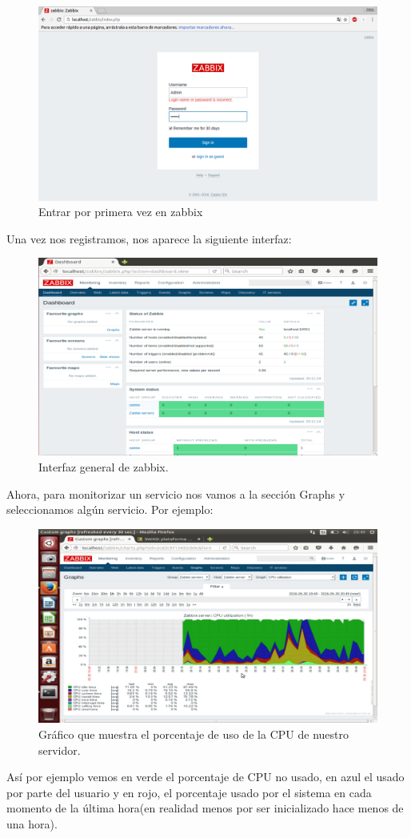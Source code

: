 \begin{itemize}
	\begin{figure}[H]
	\centering
	\includegraphics[width=0.7\linewidth]{zabbix7}
	\caption[zabbix7]{Entrar por primera vez en zabbix}
	\label{fig:zabbix7}
	\end{figure}
	
	Una vez nos registramos, nos aparece la siguiente interfaz:\\
	\begin{figure}[H]
	\centering
	\includegraphics[width=0.7\linewidth]{zabbixPORFIN}
	\caption[Interfaz zabbix]{Interfaz general de zabbix.}
	\label{fig:zabbixPORFIN}
	\end{figure}
	
	Ahora, para monitorizar un  servicio nos vamos a la sección Graphs y seleccionamos algún servicio. Por ejemplo:\\
	\begin{figure}[H]
	\centering
	\includegraphics[width=0.7\linewidth]{CPUUsage}
	\caption[Uso de CPU]{Gráfico que muestra el porcentaje de uso de la CPU de nuestro servidor.}
	\label{fig:CPUUsage}
	\end{figure}
	Así por ejemplo vemos en verde el porcentaje de CPU no usado, en azul el usado por parte del usuario y en rojo, el porcentaje usado por el sistema en cada momento de la última hora(en realidad menos por ser inicializado hace menos de una hora).


	
	
	 
\end{itemize}

